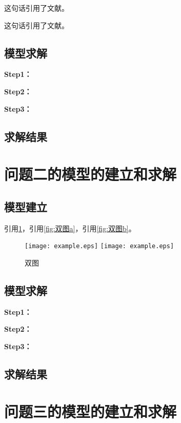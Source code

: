 \documentclass[withoutpreface,bwprint]{cumcmthesis}
\begin{document}
这句话引用了文献\cite{司守奎2011数学建模算法与应用}。

这句话引用了文献。

\subsection{模型求解}

\textbf{Step1：} 

\textbf{Step2：} 

\textbf{Step3：} 

\subsection{求解结果}



\section{问题二的模型的建立和求解}
\subsection{模型建立}

引用\cref{fig:双图}，引用\cref{fig:双图a}，引用\cref{fig:双图b}。

\begin{figure}[ht]
\centering
{}
{\texttt{[image: example.eps]}}
{\texttt{[image: example.eps]}}
\caption{双图}\label{fig:双图}
\end{figure} 

\subsection{模型求解}

\textbf{Step1：} 

\textbf{Step2：} 

\textbf{Step3：} 

\subsection{求解结果}


\section{问题三的模型的建立和求解}
\end{document}
